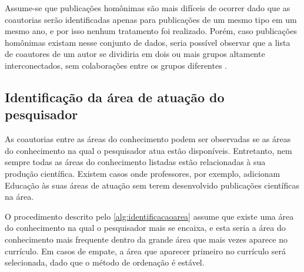 Assume-se que publicações homônimas são mais difíceis de ocorrer dado que as coautorias serão identificadas apenas para publicações de um mesmo tipo em um mesmo ano, e por isso nenhum tratamento foi realizado. Porém, caso publicações homônimas existam nesse conjunto de dados, seria possível observar que a lista de coautores de um autor se dividiria em dois ou mais grupos altamente interconectados, sem colaborações entre os grupos diferentes \cite{franceschet2011collaboration}.

\subsection{Identificação da área de atuação do pesquisador}

As coautorias entre as áreas do conhecimento podem ser observadas se as áreas do conhecimento na qual o pesquisador atua estão disponíveis. Entretanto, nem sempre todas as áreas do conhecimento listadas estão relacionadas à sua produção científica. Existem casos onde professores, por exemplo, adicionam Educação às suas áreas de atuação sem terem desenvolvido publicações científicas na área.

O procedimento descrito pelo \autoref{alg:identificacaoarea} assume que existe uma área do conhecimento na qual o pesquisador mais se encaixa, e esta seria a área do conhecimento mais frequente dentro da grande área que mais vezes aparece no currículo. Em casos de empate, a área que aparecer primeiro no currículo será selecionada, dado que o método de ordenação é estável.

